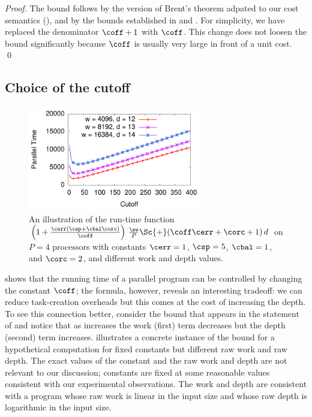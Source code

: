 \begin{proof}
The bound follows by the version of Brent's theorem
adpated to our cost semantics
(), and by the bounds 
established in
 and . 
For simplicity, we have replaced the denominator $\coff+1$
with $\coff$. This change does not loosen the bound significantly
because $\coff$ is usually very large in front of a unit cost.
 \qed
\end{proof}

\subsection{Choice of the cutoff}

\begin{figure}
\includegraphics[width=3in]{pictures/plot-run-time-versus-k-multi}

\caption{An illustration of the run-time function $\left(
  1+\frac{\cerr(\csp+\cbal\corc)}{\coff} \right)\,\frac{\sw}{P} \Sc{+}
  (\coff\cerr+\corc+1)\,d$ on $P = 4$ processors with constants $\cerr =1$,
   $\csp = 5$, $\cbal = 1$, and $\corc = 2$, and different work and
  depth values.}

\label{fig:run-time-versus-kappa}
\end{figure}

 shows that the running time of a parallel
program can be controlled by changing the constant $\coff$; the
formula, however, reveals an interesting tradeoff: we can reduce
task-creation overheads but this comes at the cost of increasing the
depth.  To see this connection better, consider the bound
that appears in the statement of 
and notice that as \coff increases the work (first) term decreases
but the depth (second) term increases.  
illustrates a concrete instance of the bound for a hypothetical
computation for fixed constants but different raw work and raw depth.
The exact values of the constant and the raw work and depth are not
relevant to our discussion; constants are fixed at some reasonable
values consistent with our experimental observations.  The work and
depth are consistent with a program whose raw work is linear
in the input size
and whose raw depth is logarithmic in the input size.

